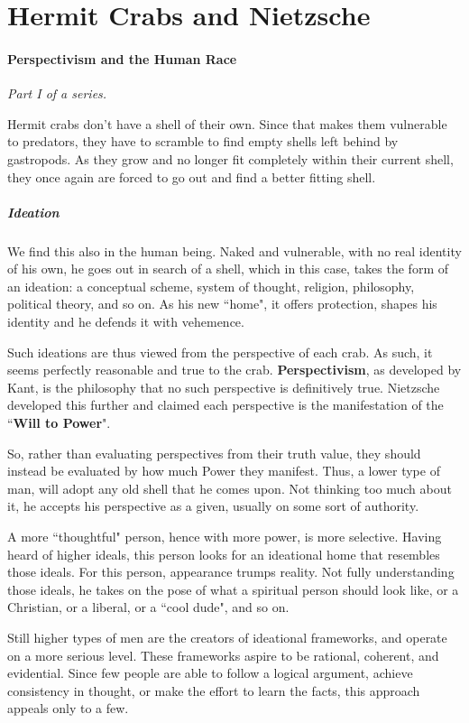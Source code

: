 \section{Hermit Crabs and Nietzsche}

\paragraph{Perspectivism and the Human Race}
\emph{Part I of a series.}



Hermit crabs don't have a shell of their own. Since that makes them vulnerable to predators, they have to scramble to find empty shells left behind by gastropods. As they grow and no longer fit completely within their current shell, they once again are forced to go out and find a better fitting shell. 

\subparagraph{Ideation}
We find this also in the human being. Naked and vulnerable, with no real identity of his own, he goes out in search of a shell, which in this case, takes the form of an ideation: a conceptual scheme, system of thought, religion, philosophy, political theory, and so on. As his new ``home", it offers protection, shapes his identity and he defends it with vehemence. 

Such ideations are thus viewed from the perspective of each crab. As such, it seems perfectly reasonable and true to the crab. \textbf{Perspectivism}, as developed by Kant, is the philosophy that no such perspective is definitively true. Nietzsche developed this further and claimed each perspective is the manifestation of the ``\textbf{Will to Power}". 

So, rather than evaluating perspectives from their truth value, they should instead be evaluated by how much Power they manifest. Thus, a lower type of man, will adopt any old shell that he comes upon. Not thinking too much about it, he accepts his perspective as a given, usually on some sort of authority. 

A more ``thoughtful" person, hence with more power, is more selective. Having heard of higher ideals, this person looks for an ideational home that resembles those ideals. For this person, appearance trumps reality. Not fully understanding those ideals, he takes on the pose of what a spiritual person should look like, or a Christian, or a liberal, or a ``cool dude", and so on. 

Still higher types of men are the creators of ideational frameworks, and operate on a more serious level. These frameworks aspire to be rational, coherent, and evidential. Since few people are able to follow a logical argument, achieve consistency in thought, or make the effort to learn the facts, this approach appeals only to a few. 

